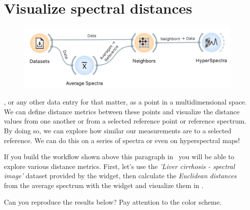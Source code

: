 \chapter{Visualize spectral distances}
\label{ch:visualize-spectral-distances}

\begin{figure}
	\vspace{-1.5 cm}
    \includegraphics[scale=0.6]{graphics/ch-visualize_spectral_distances/ch-visualize_spectral_distances-fig1.png}
\end{figure}

, or any other data entry for that matter, as a point in a multidimensional space. We can define distance metrics between these points and visualize the distance values from one another or from a selected reference point or reference spectrum. By doing so, we can explore how similar our measurements are to a selected reference. We can do this on a series of spectra or even on hyperspectral maps!

If you build the workflow shown above this paragraph in \mutation\ you will be able to explore various distance metrics. First, let's use the \textit{'Liver cirrhosis - spectral image'} dataset provided by the  widget, then calculate the \textit{Euclidean distances} from the average spectrum with the  widget and visualize them in . 

\medskip
Can you reproduce the results below? Pay attention to the color scheme.

